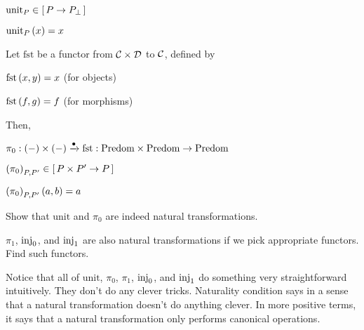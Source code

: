 \begin{enumcirc}
\begin{enumrm}
		\begin{center}
			$\textrm{unit}_P \in \left[ \, P \to P_\bot \, \right]$

			$\textrm{unit}_P\left( x \right) = x$
		\end{center}
		\item
		Let $\textrm{fst}$ be a functor from $\mathcal{C} \times \mathcal{D}$ to $\mathcal{C}$, defined by

		\begin{center}
			$\textrm{fst}\left( x, y \right) = x$ (for objects)

			$\textrm{fst}\left( f, g \right) = f$ (for morphisms)
		\end{center}

		Then,

		$\pi_0 : \left( - \right) \times \left( - \right) \xrightarrow{\bullet} \textrm{fst}: \text{Predom} \times \text{Predom} \to \text{Predom}$

		\begin{center}
			$\left( \pi_0 \right)_{P, P'} \in \left[ \, P \times P' \to P \, \right]$

			$\left( \pi_0 \right)_{P, P'}\left( a, b \right) = a$
		\end{center}
	\end{enumrm}
	\begin{exercisetab}
		Show that $\textrm{unit}$ and $\pi_0$ are indeed natural transformations.
	\end{exercisetab}
	\begin{exercisetab}
		$\pi_1$, $\textrm{inj}_0$, and $\textrm{inj}_1$ are also natural transformations if we pick
		appropriate functors.
		Find such functors.
	\end{exercisetab}
	\item
	Notice that all of $\textrm{unit}$, $\pi_0$, $\pi_1$, $\textrm{inj}_0$, and $\textrm{inj}_1$ do
	something very straightforward intuitively.
	They don't do any clever tricks.
	Naturality condition says in a sense that a natural transformation doesn't do
	anything clever.
	In more positive terms, it says that a natural transformation only performs
	canonical operations.
\end{enumcirc}
